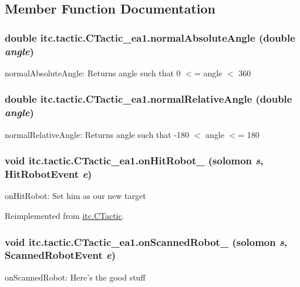 \subsection{Member Function Documentation}
\hypertarget{classitc_1_1tactic_1_1_c_tactic__ea1_a3b4e695a085e2c955ec3059059df5eb5}{
\subsubsection[{normalAbsoluteAngle}]{\setlength{\rightskip}{0pt plus 5cm}double itc.tactic.CTactic\_\-ea1.normalAbsoluteAngle (double {\em angle})}}
\label{classitc_1_1tactic_1_1_c_tactic__ea1_a3b4e695a085e2c955ec3059059df5eb5}
normalAbsoluteAngle: Returns angle such that 0 $<$= angle $<$ 360 \hypertarget{classitc_1_1tactic_1_1_c_tactic__ea1_ad3ae664f65b129510e03e04b83ad2fc2}{
\subsubsection[{normalRelativeAngle}]{\setlength{\rightskip}{0pt plus 5cm}double itc.tactic.CTactic\_\-ea1.normalRelativeAngle (double {\em angle})}}
\label{classitc_1_1tactic_1_1_c_tactic__ea1_ad3ae664f65b129510e03e04b83ad2fc2}
normalRelativeAngle: Returns angle such that -\/180 $<$ angle $<$= 180 \hypertarget{classitc_1_1tactic_1_1_c_tactic__ea1_a2eb8e76f5f9f629359436a611b8a09e5}{
\subsubsection[{onHitRobot\_\-}]{\setlength{\rightskip}{0pt plus 5cm}void itc.tactic.CTactic\_\-ea1.onHitRobot\_\- ({\bf solomon} {\em s}, \/  HitRobotEvent {\em e})}}
\label{classitc_1_1tactic_1_1_c_tactic__ea1_a2eb8e76f5f9f629359436a611b8a09e5}
onHitRobot: Set him as our new target 

Reimplemented from \hyperlink{classitc_1_1_c_tactic_a19cf73207948eff2c6db7d90fce8bd55}{itc.CTactic}.\hypertarget{classitc_1_1tactic_1_1_c_tactic__ea1_aa483435460b0ee4fabe62e2d46493c7d}{
\subsubsection[{onScannedRobot\_\-}]{\setlength{\rightskip}{0pt plus 5cm}void itc.tactic.CTactic\_\-ea1.onScannedRobot\_\- ({\bf solomon} {\em s}, \/  ScannedRobotEvent {\em e})}}
\label{classitc_1_1tactic_1_1_c_tactic__ea1_aa483435460b0ee4fabe62e2d46493c7d}
onScannedRobot: Here's the good stuff 


